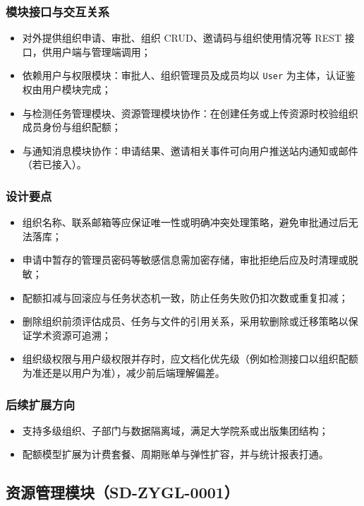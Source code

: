 \subsubsection{模块接口与交互关系}
\begin{itemize}[leftmargin=2em]
    \item 对外提供组织申请、审批、组织 CRUD、邀请码与组织使用情况等 REST 接口，供用户端与管理端调用；
    \item 依赖用户与权限模块：审批人、组织管理员及成员均以 \texttt{User} 为主体，认证鉴权由用户模块完成；
    \item 与检测任务管理模块、资源管理模块协作：在创建任务或上传资源时校验组织成员身份与组织配额；
    \item 与通知消息模块协作：申请结果、邀请相关事件可向用户推送站内通知或邮件（若已接入）。
\end{itemize}

\subsubsection{设计要点}
\begin{itemize}[leftmargin=2em]
    \item 组织名称、联系邮箱等应保证唯一性或明确冲突处理策略，避免审批通过后无法落库；
    \item 申请中暂存的管理员密码等敏感信息需加密存储，审批拒绝后应及时清理或脱敏；
    \item 配额扣减与回滚应与任务状态机一致，防止任务失败仍扣次数或重复扣减；
    \item 删除组织前须评估成员、任务与文件的引用关系，采用软删除或迁移策略以保证学术资源可追溯；
    \item 组织级权限与用户级权限并存时，应文档化优先级（例如检测接口以组织配额为准还是以用户为准），减少前后端理解偏差。
\end{itemize}

\subsubsection{后续扩展方向}
\begin{itemize}[leftmargin=2em]
    \item 支持多级组织、子部门与数据隔离域，满足大学院系或出版集团结构；
    \item 配额模型扩展为计费套餐、周期账单与弹性扩容，并与统计报表打通。
\end{itemize}

\subsection{资源管理模块（SD-ZYGL-0001）}

